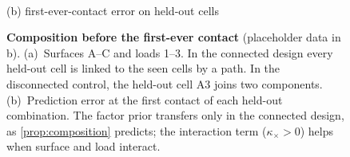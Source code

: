 \begin{figure}[t]
\begin{minipage}[b]{0.54\linewidth}
\\[-2pt]{\scriptsize (b) first-ever-contact error on held-out cells}
\end{minipage}
\caption{\textbf{Composition before the first-ever contact} (placeholder data in b). (a)~Surfaces A--C and loads 1--3. In the connected design every held-out cell is linked to the seen cells by a path. In the disconnected control, the held-out cell A3 joins two components. (b)~Prediction error at the first contact of each held-out combination. The factor prior transfers only in the connected design, as \cref{prop:composition} predicts; the interaction term ($\kappa_\times>0$) helps when surface and load interact.}
\label{fig:composition}
\end{figure}
